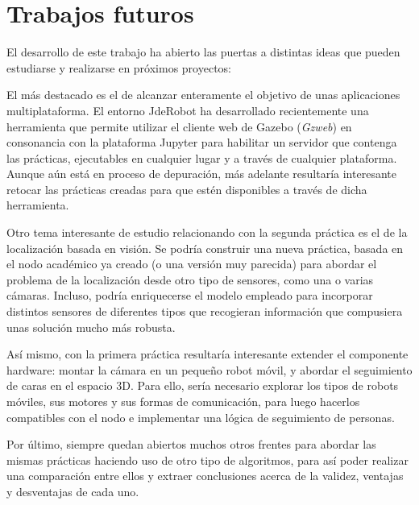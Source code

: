 \section{Trabajos futuros}
El desarrollo de este trabajo ha abierto las puertas a distintas ideas que pueden estudiarse y realizarse en próximos proyectos:

El más destacado es el de alcanzar enteramente el objetivo de unas aplicaciones multiplataforma. El entorno JdeRobot ha desarrollado recientemente una herramienta que permite utilizar el cliente web de Gazebo (\textit{Gzweb}) en consonancia con la plataforma Jupyter para habilitar un servidor que contenga las prácticas, ejecutables en cualquier lugar y a través de cualquier plataforma. Aunque aún está en proceso de depuración, más adelante resultaría interesante retocar las prácticas creadas para que estén disponibles a través de dicha herramienta. 

Otro tema interesante de estudio relacionando con la segunda práctica es el de la localización basada en visión. Se podría construir una nueva práctica, basada en el nodo académico ya creado (o una versión muy parecida) para abordar el problema de la localización desde otro tipo de sensores, como una o varias cámaras. Incluso, podría enriquecerse el modelo empleado para incorporar distintos sensores de diferentes tipos que recogieran información que compusiera unas solución mucho más robusta.

Así mismo, con la primera práctica resultaría interesante extender el componente hardware: montar la cámara en un pequeño robot móvil, y abordar el seguimiento de caras en el espacio 3D. Para ello, sería necesario explorar los tipos de robots móviles, sus motores y sus formas de comunicación, para luego hacerlos compatibles con el nodo e implementar una lógica de seguimiento de personas.

Por último, siempre quedan abiertos muchos otros frentes para abordar las mismas prácticas haciendo uso de otro tipo de algoritmos, para así poder realizar una comparación entre ellos y extraer conclusiones acerca de la validez, ventajas y desventajas de cada uno. 